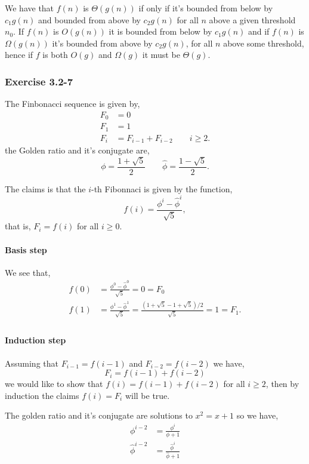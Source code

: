 \documentclass{article}
\begin{document}
We have that $f(n)$ is $\Theta(g(n))$ if only if it's bounded from below by $c_1g(n)$ and bounded from above by $c_2g(n)$ for all $n$ above a given threshold $n_0$. If $f(n)$ is $O(g(n))$ it is bounded from below by $c_1g(n)$ and if $f(n)$ is $\Omega(g(n))$ it's bounded from above by $c_2g(n)$, for all $n$ above some threshold, hence if $f$ is both $O(g)$ and $\Omega(g)$ it must be $\Theta(g)$.

\subsubsection*{Exercise 3.2-7}

The Finbonacci sequence is given by,
\begin{align*}
F_0 &= 0\\
F_1 &= 1\\
F_i &= F_{i-1} + F_{i-2}\qquad i\geq 2.
\end{align*}
the Golden ratio and it's conjugate are,
\[
\phi = \frac{1+\sqrt{5}}{2}\qquad\hat{\phi} = \frac{1-\sqrt{5}}{2}.
\]

The claims is that the $i$-th Fibonnaci is given by the function,
\[
f(i) = \frac{\phi^i-\hat{\phi}^i}{\sqrt{5}},
\]
that is, $F_i = f(i)$ for all $i\geq0$.
\paragraph{Basis step}
We see that,
\begin{align*}
f(0) &= \frac{\phi^0-\hat{\phi}^0}{\sqrt{5}} = 0 = F_0\\
f(1) &= \frac{\phi^1-\hat{\phi}^1}{\sqrt{5}} = \frac{(1+\sqrt{5}-1+\sqrt{5})/2}{\sqrt{5}} = 1 = F_1.\\
\end{align*}


\paragraph{Induction step} Assuming that $F_{i-1}=f(i-1)$ and $F_{i-2}=f(i-2)$ we have,
\[
F_i = f(i-1)+ f(i-2)
\]
we would like to show that $f(i)=f(i-1)+ f(i-2)$ for all $i\geq2$, then by induction the claims $f(i) = F_i$ will be true.

The golden ratio and it's conjugate are solutions to $x^2 = x+1$ so we have,
\begin{align*}
\phi^{i-2} &= \frac{\phi^i}{\phi+1} \\
\hat{\phi}^{i-2} &= \frac{\hat{\phi}^i}{\hat{\phi}+1} \\
\end{align*}
\end{document}
